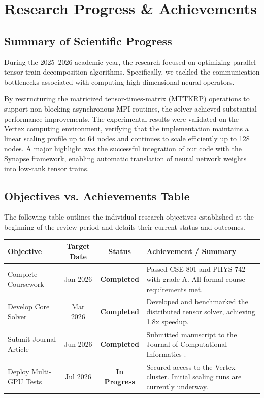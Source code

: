 \section{Research Progress \& Achievements}

\subsection{Summary of Scientific Progress}
During the 2025--2026 academic year, the research focused on optimizing parallel tensor train decomposition algorithms. Specifically, we tackled the communication bottlenecks associated with computing high-dimensional neural operators. 

By restructuring the matricized tensor-times-matrix (MTTKRP) operations to support non-blocking asynchronous MPI routines, the solver achieved substantial performance improvements. The experimental results were validated on the Vertex computing environment, verifying that the implementation maintains a linear scaling profile up to 64 nodes and continues to scale efficiently up to 128 nodes. A major highlight was the successful integration of our code with the Synapse framework, enabling automatic translation of neural network weights into low-rank tensor trains.

\subsection{Objectives vs. Achievements Table}
The following table outlines the individual research objectives established at the beginning of the review period and details their current status and outcomes.

\medskip
\begin{tabularx}{\textwidth}{>{\hsize=0.25\hsize}X c c >{\hsize=0.55\hsize}X}
  \toprule
  \textbf{Objective} & \textbf{Target Date} & \textbf{Status} & \textbf{Achievement / Summary} \\
  \midrule
  Complete Coursework & Jan 2026 & \textcolor{statusgreen}{\bfseries Completed} & Passed CSE 801 and PHYS 742 with grade A. All formal course requirements met. \\
  Develop Core Solver & Mar 2026 & \textcolor{statusgreen}{\bfseries Completed} & Developed and benchmarked the distributed tensor solver, achieving 1.8x speedup. \\
  Submit Journal Article & Jun 2026 & \textcolor{statusgreen}{\bfseries Completed} & Submitted manuscript to the Journal of Computational Informatics \cite{vance2025synapse}. \\
  Deploy Multi-GPU Tests & Jul 2026 & \textcolor{statusorange}{\bfseries In Progress} & Secured access to the Vertex cluster. Initial scaling runs are currently underway. \\
  \bottomrule
\end{tabularx}
\medskip

